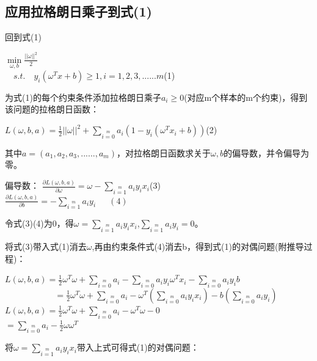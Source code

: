 \documentclass[UTF8]{ctexart}
\begin{document}
{\subsection{应用拉格朗日乘子到式(1)}
回到式(1)\begin{center}
    \Large{
        $\min\limits_{\omega,b}$$\frac{||\omega||^2}{2}$\\[2ex]
        $\quad s.t.\quad y_i(\omega^Tx+b)\geq1,i=1,2,3,......m$(1)
    }
\end{center}\par
为式(1)的每个约束条件添加拉格朗日乘子$a_i\geq0$(对应m个样本的m个约束)，得到该问题的拉格朗日函数：
\begin{center}
    \Large{
        $L(\omega,b,a)=\frac{1}{2}||\omega||^2+\sum\limits_{i=0}\limits^m$$a_i(1-y_i(\omega^Tx_i+b))$\quad(2)
    }
\end{center}\par
其中$a=(a_1,a_2,a_3,......,a_m)$，对拉格朗日函数求关于$\omega,b$的偏导数，并令偏导为零。\par
\begin{center}
    偏导数：\Large{
        $\frac{\partial L(\omega,b,a)}{\partial \omega}=\omega-\sum\limits_{i=1}\limits^ma_iy_ix_i$(3)\\[2ex]
        \phantom{偏导数：}$\frac{\partial L(\omega,b,a)}{\partial b}=-\sum\limits_{i=1}\limits^ma_iy_i\phantom{111}(4)$
    }
\end{center}\par
令式(3)(4)为0，得$\omega=\sum\limits_{i=1}\limits^ma_iy_ix_i$,$\sum\limits_{i=1}\limits^ma_iy_i=0$。\par
将式(3)带入式(1)消去$\omega$,再由约束条件式(4)消去b，得到式(1)的对偶问题(附推导过程)：\par
\begin{center}
    \Large{
        $L(\omega,b,a)=\frac{1}{2}\omega^T\omega+\sum\limits_{i=0}\limits^ma_i-\sum\limits_{i=0}\limits^ma_iy_i\omega^Tx_i-\sum\limits_{i=0}\limits^ma_iy_ib$\\
        $\phantom{aaaaaaaaaaa}=\frac{1}{2}\omega^T\omega+\sum\limits_{i=0}\limits^ma_i-\omega^T(\sum\limits_{i=0}\limits^ma_iy_ix_i)-b(\sum\limits_{i=0}\limits^ma_iy_i)$\newpage
        $L(\omega,b,a)=\frac{1}{2}\omega^T\omega+\sum\limits_{i=0}\limits^ma_i-\omega^T\omega-0$\\
        $=\sum\limits_{i=0}\limits^ma_i-\frac{1}{2}\omega\omega^T\phantom{a}$ 
    }
\end{center}
将$\omega=\sum\limits_{i=1}\limits^ma_iy_ix_i$带入上式可得式(1)的对偶问题：\par
}
\end{document}
